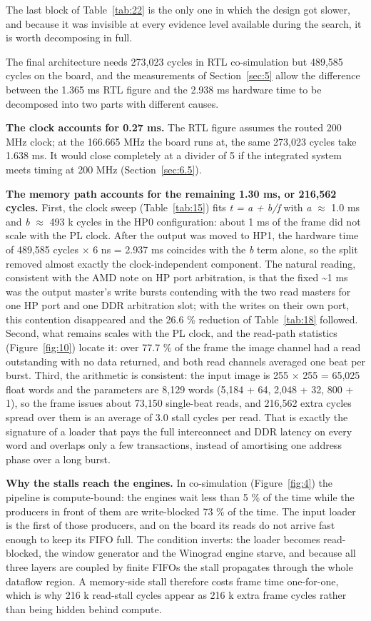 The last block of Table~\ref{tab:22} is the only one in which the design got slower, and because it was invisible at every evidence level available during the search, it is worth decomposing in full.

The final architecture needs 273,023 cycles in RTL co-simulation but 489,585 cycles on the board, and the measurements of Section~\ref{sec:5} allow the difference between the 1.365 ms RTL figure and the 2.938 ms hardware time to be decomposed into two parts with different causes.

\textbf{The clock accounts for 0.27 ms.} The RTL figure assumes the routed 200 MHz clock; at the 166.665 MHz the board runs at, the same 273,023 cycles take 1.638 ms. It would close completely at a divider of 5 if the integrated system meets timing at 200 MHz (Section~\ref{sec:6.5}).

\textbf{The memory path accounts for the remaining 1.30 ms, or 216,562 cycles.} First, the clock sweep (Table~\ref{tab:15}) fits \emph{t = a + b/f} with \emph{a} $\approx$ 1.0 ms and \emph{b} $\approx$ 493 k cycles in the HP0 configuration: about 1 ms of the frame did not scale with the PL clock. After the output was moved to HP1, the hardware time of 489,585 cycles $\times$ 6 ns = 2.937 ms coincides with the \emph{b} term alone, so the split removed almost exactly the clock-independent component. The natural reading, consistent with the AMD note on HP port arbitration, is that the fixed \textasciitilde{}1 ms was the output master's write bursts contending with the two read masters for one HP port and one DDR arbitration slot; with the writes on their own port, this contention disappeared and the 26.6 \% reduction of Table~\ref{tab:18} followed. Second, what remains scales with the PL clock, and the read-path statistics (Figure~\ref{fig:10}) locate it: over 77.7 \% of the frame the image channel had a read outstanding with no data returned, and both read channels averaged one beat per burst. Third, the arithmetic is consistent: the input image is 255 $\times$ 255 = 65,025 float words and the parameters are 8,129 words (5,184 + 64, 2,048 + 32, 800 + 1), so the frame issues about 73,150 single-beat reads, and 216,562 extra cycles spread over them is an average of 3.0 stall cycles per read. That is exactly the signature of a loader that pays the full interconnect and DDR latency on every word and overlaps only a few transactions, instead of amortising one address phase over a long burst.

\textbf{Why the stalls reach the engines.} In co-simulation (Figure~\ref{fig:4}) the pipeline is compute-bound: the engines wait less than 5 \% of the time while the producers in front of them are write-blocked 73 \% of the time. The input loader is the first of those producers, and on the board its reads do not arrive fast enough to keep its FIFO full. The condition inverts: the loader becomes read-blocked, the window generator and the Winograd engine starve, and because all three layers are coupled by finite FIFOs the stall propagates through the whole dataflow region. A memory-side stall therefore costs frame time one-for-one, which is why 216 k read-stall cycles appear as 216 k extra frame cycles rather than being hidden behind compute.

